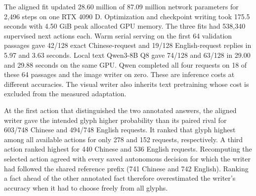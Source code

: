 The aligned fit updated 28.60 million of 87.09 million network parameters for 2,496 steps on one RTX 4090 D. Optimization and checkpoint writing took 175.5 seconds with 4.50 GiB peak allocated GPU memory. The three fits had 538,340 supervised next actions each. Warm serial serving on the first 64 validation passages gave 42/128 exact Chinese-request and 19/128 English-request replies in 5.97 and 3.63 seconds. Local text Qwen3-8B Q8 gave 74/128 and 63/128 in 29.00 and 29.88 seconds on the same GPU. Qwen completed all four requests on 18 of these 64 passages and the image writer on zero. These are inference costs at different accuracies. The visual writer also inherits text pretraining whose cost is excluded from the measured adaptation.

At the first action that distinguished the two annotated answers, the aligned writer gave the intended glyph higher probability than its paired rival for 603/748 Chinese and 494/748 English requests. It ranked that glyph highest among all available actions for only 278 and 152 requests, respectively. A third action ranked highest for 440 Chinese and 536 English requests. Recomputing the selected action agreed with every saved autonomous decision for which the writer had followed the shared reference prefix (741 Chinese and 742 English). Ranking a fact ahead of the other annotated fact therefore overestimated the writer's accuracy when it had to choose freely from all glyphs.
